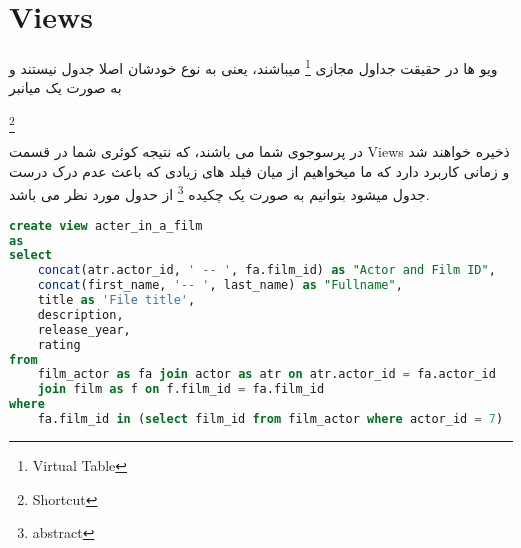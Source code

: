 \documentclass[20pt]{article}
\begin{document}
\section{Views}
ویو ها در حقیقت جداول مجازی \footnote{Virtual Table }
میباشند، یعنی به نوع خودشان اصلا جدول نیستند و به صورت یک میانبر
\begin{LTR}\footnote{Shortcut} \end{LTR}
در پرسوجوی شما می باشند، که نتیجه کوئری شما در قسمت Views ذخیره خواهند شد و زمانی کاربرد دارد که ما میخواهیم از میان فیلد های زیادی که باعث عدم درک درست جدول میشود بتوانیم به صورت یک چکیده 
\footnote{abstract}
از حدول مورد نظر می باشد.


\begin{LTR}
\begin{lstlisting}[language=SQL, caption=SQL Views]
create view acter_in_a_film
as
select 
	concat(atr.actor_id, ' -- ', fa.film_id) as "Actor and Film ID",
    concat(first_name, '-- ', last_name) as "Fullname",
    title as 'File title',
    description,
    release_year,
    rating    
from 
	film_actor as fa join actor as atr on atr.actor_id = fa.actor_id
	join film as f on f.film_id = fa.film_id
where 
	fa.film_id in (select film_id from film_actor where actor_id = 7)
\end{lstlisting}
\end{LTR}
\end{document}
